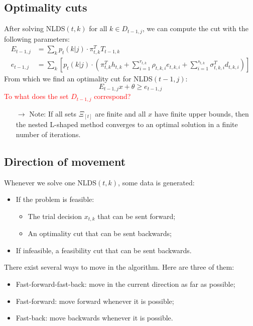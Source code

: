 \documentclass[12pt, openany]{report}
\theoremstyle{definition}
\begin{document}
\subsection{Optimality cuts}
After solving NLDS$(t,k)$ for all $k\in D_{t-1,j}$, we can compute the cut with the following parameters:
\begin{equation}
	\begin{aligned}
		E_{t-1,j} &= \sum_k p_t(k|j) \cdot \pi_{t,k}^T T_{t-1,k}\\
		e_{t-1,j} &= \sum_k \left[p_t(k|j)\cdot \left(\pi_{t,k}^Th_{t,k} + \sum_{i=1}^{r_{t,k}} \rho_{t,k,i}e_{t,k,i} + \sum_{i=1}^{s_{t,k}} \sigma_{t,k,i}^Td_{t,k,i}\right)\right]
	\end{aligned}
\end{equation}
From which we find an optimality cut for NLDS$(t-1,j)$:
\begin{equation}
	E_{t-1,j}x+\theta \ge e_{t-1,j}
\end{equation}
\textcolor{red}{To what does the set $D_{t-1,j}$ correspond?} 
\begin{itemize}
	\item [$\to$] Note: If all sets $\Xi_{[t]}$ are finite and all $x$ have finite upper bounds, then the nested L-shaped method converges to an optimal solution in a finite number of iterations.
\end{itemize}
\subsection{Direction of movement}
Whenever we solve one NLDS$(t,k)$, some data is generated:
\begin{itemize}
	\item If the problem is feasible:
	\begin{itemize}
		\item The trial decision $x_{t,k}$ that can be sent forward;
		\item An optimality cut that can be sent backwards;
	\end{itemize}
	\item If infeasible, a feasibility cut that can be sent backwards.
\end{itemize}
There exist several ways to move in the algorithm. Here are three of them:
\begin{itemize}
	\item Fast-forward-fast-back: move in the current direction as far as possible;
	\item Fast-forward: move forward whenever it is possible;
	\item Fast-back: move backwards whenever it is possible.
\end{itemize}
\end{document}
